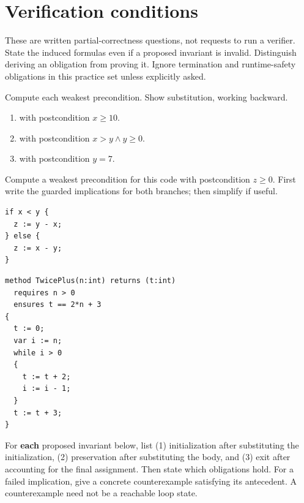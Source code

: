 \chapter{Verification conditions}
These are written partial-correctness questions, not requests to run a verifier.
State the induced formulas even if a proposed invariant is invalid. Distinguish
deriving an obligation from proving it. Ignore termination and runtime-safety
obligations in this practice set unless explicitly asked.

Compute each weakest precondition. Show substitution, working backward.
\begin{enumerate}[label=(\alph*)]
\item {} with postcondition $x\geq 10$.
\item {} with postcondition $x>y\land y\geq 0$.
\item {} with postcondition $y=7$.
\end{enumerate}

Compute a weakest precondition for this code with postcondition $z\geq 0$.
First write the guarded implications for both branches; then simplify if useful.
\par\noindent\begin{minipage}{\linewidth}
\begin{lstlisting}
if x < y {
  z := y - x;
} else {
  z := x - y;
}
\end{lstlisting}
\end{minipage}\par
{}

\par\noindent\begin{minipage}{\linewidth}
\begin{lstlisting}
method TwicePlus(n:int) returns (t:int)
  requires n > 0
  ensures t == 2*n + 3
{
  t := 0;
  var i := n;
  while i > 0
  {
    t := t + 2;
    i := i - 1;
  }
  t := t + 3;
}
\end{lstlisting}
\end{minipage}\par
For \textbf{each} proposed invariant below, list (1) initialization after
substituting the initialization, (2) preservation after substituting the body,
and (3) exit after accounting for the final assignment. Then state which
obligations hold. For a failed implication, give a concrete counterexample
satisfying its antecedent. A counterexample need not be a reachable loop state.

